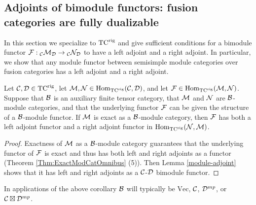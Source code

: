 \documentclass{amsart}
\begin{document}

\vspace{0.5cm}



\subsection{Adjoints of bimodule functors: fusion categories are fully dualizable} \label{sec-df-functors}

In this section we specialize to ${\mathrm{TC}^{\text{rig}}}$ and give sufficient conditions for a bimodule functor $\mathcal F: {}_\mathcal C \mathcal M_\mathcal D \rightarrow {}_\mathcal C \mathcal N_\mathcal D$ to have a left adjoint and a right adjoint.  In particular, we show that any module functor between semisimple module categories over fusion categories has a left adjoint and a right adjoint. 


\begin{lemma} \label{lma:2morAdjunction}
Let $\mathcal C, \mathcal D \in {\mathrm{TC}^{\text{rig}}}$, let $\mathcal M, \mathcal N \in \operatorname{Hom}_{\mathrm{TC}^{\text{rig}}}(\mathcal C,\mathcal D)$, and let $\mathcal F \in \operatorname{Hom}_{{\mathrm{TC}^{\text{rig}}}}(\mathcal M,\mathcal N)$.  Suppose that $\mathcal B$ is an auxiliary finite tensor category, that $\mathcal M$ and $\mathcal N$ are $\mathcal B$-module categories, and that the underlying functor $\mathcal F$ can be given the structure of a $\mathcal B$-module functor.  If $\mathcal M$ is exact as a $\mathcal B$-module category, then $\mathcal F$ has both a left adjoint functor and a right adjoint functor in $\operatorname{Hom}_{{\mathrm{TC}^{\text{rig}}}}(\mathcal N,\mathcal M)$.  
\end{lemma}
\begin{proof}
Exactness of $\mathcal M$ as a $\mathcal B$-module category guarantees that the underlying functor of $\mathcal F$ is exact and thus has both left and right adjoints as a functor (Theorem \ref{Thm:ExactModCatOmnibus} (5)).  Then Lemma \ref{module-adjoint} shows that it has left and right adjoints as a $\mathcal C$-$\mathcal D$ bimodule functor.
\end{proof}

\begin{remark}
In applications of the above corollary $\mathcal B$ will typically be $\mathrm{Vec}$, $\mathcal C$, $\mathcal D^{mp}$, or $\mathcal C \boxtimes \mathcal D^{mp}$.
\end{remark}
\end{document}
